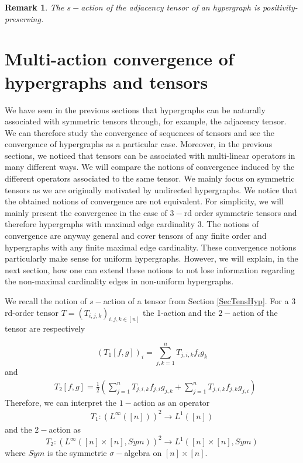 \documentclass[11pt]{article}
\newtheorem{remark}[theorem]{Remark}
\begin{document}
\begin{remark}
The $s-$action of the adjacency tensor of an hypergraph is positivity-preserving. 
\end{remark}
\section{Multi-action convergence of hypergraphs and tensors}\label{SecMultActTensHyp}

We have seen in the previous sections that hypergraphs can be naturally associated with symmetric tensors through, for example, the adjacency tensor. We can therefore study the convergence of sequences of tensors and see the convergence of hypergraphs as a particular case. Moreover, in the previous sections, we noticed that tensors can be associated with multi-linear operators in many different ways. We will compare the notions of convergence induced by the different operators associated to the same tensor. We mainly focus on symmetric tensors as we are originally motivated by undirected hypergraphs. We notice that the obtained notions of convergence are not equivalent. For simplicity, we will mainly present the convergence in the case of $3-$rd order symmetric tensors and therefore hypergraphs with maximal edge cardinality 3. The notions of convergence are anyway general and cover tensors of any finite order and hypergraphs with any finite maximal edge cardinality. These convergence notions particularly make sense for uniform hypergraphs. However, we will explain, in the next section, how one can extend these notions to not lose information regarding the non-maximal cardinality edges in non-uniform hypergraphs.

We recall the notion of $s-$action of a tensor from Section \ref{SecTensHyp}. For a $3$rd-order tensor $T=(T_{i,j,k})_{i,j,k\in [n]}$ the 1-action and the $2-$action of the tensor are respectively 

\begin{equation*}
(T_1[f,g])_{i}=\sum^n_{j,k=1}T_{j,i,k}f_{i}g_{k} 
\end{equation*}and
$$
\begin{aligned}
& T_2[f,g]=\frac{1}{2}(\sum^n_{j=1}T_{j,i,k}f_{j,i}g_{j,k} +\sum^n_{j=1}T_{j,i,k}f_{j,k}g_{j,i})
\end{aligned}
$$
Therefore, we can interpret the $1-$action as an operator 
$$
\begin{aligned}
T_1:(L^{\infty}([n]))^2\longrightarrow L^{1}([n])
\end{aligned}
$$
and the $2-$action as
$$T_2:(L^{\infty}([n]\times [n],Sym))^2\longrightarrow L^{1}([n]\times [n],Sym)$$
where $Sym$ is the symmetric $\sigma-$algebra on $[n]\times [n]$.
\end{document}
